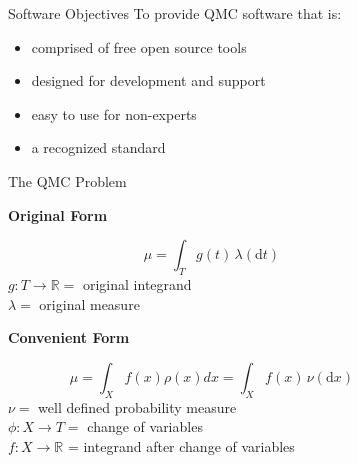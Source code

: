\documentclass[final]{beamer}
\newcommand{\bfCenter}[1]{\centerline{\textbf{#1}}}
\newlength{\sepwid}
\newlength{\onecolwid}
\newlength{\threecolwid}
\newcommand{\dif}{\mathrm{d}}
\begin{document}
\setlength{\belowcaptionskip}{2ex}
\setlength\belowdisplayshortskip{2ex}
\begin{frame}[t]
\vspace{-2ex}
\begin{columns}[t]

\begin{column}{\sepwid}\end{column}
\begin{column}{\threecolwid}
\begin{columns}[t,totalwidth=\threecolwid]  

\begin{column}{\onecolwid}\vspace{-1in}
\begin{block}{Software Objectives}
    To provide QMC software \cite{HicEtal19} that is: 
    \begin{itemize}
        \item comprised of free open source tools
        \item designed for development and support 
        \item easy to use for non-experts
        \item a recognized standard
    \end{itemize}
\end{block}

\vspace{-2ex}
\begin{block}{The QMC Problem}
    \bfCenter{Original Form} 
        \begin{equation*}
            \mu = \int_{T} g(t) \, \lambda(\dif t) 
            \label{eq:ogProblem}
        \end{equation*}
        $ g:T \rightarrow \mathbb{R} = $ original integrand \\
        $ \lambda = $ original measure

    \vspace{2ex}
    \bfCenter{Convenient Form}
        \begin{equation*}
            \mu = \int_{X} f(x)\rho(x)dx = \int_{X} f(x) \, \nu( \dif x)
            \label{convForm}
        \end{equation*}
        $\nu = $ well defined probability measure\\
        $\phi: X \rightarrow T = $ change of variables\\
        $f: X \rightarrow \mathbb{R} $ = integrand after change of variables
        

\end{block}
\end{column}
\end{columns}
\end{column}
\end{columns}
\end{frame}
\end{document}
